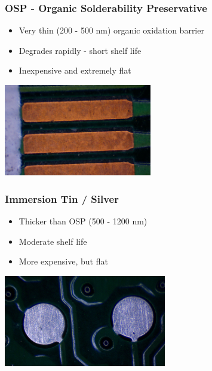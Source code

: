 \documentclass{beamer}
\begin{document}
\begin{frame}
\frametitle{OSP - Organic Solderability Preservative}
\begin{itemize}
\item Very thin (200 - 500 nm) organic oxidation barrier
\item Degrades rapidly - short shelf life
\item Inexpensive and extremely flat
\end{itemize}
\begin{center}
\includegraphics[height=4cm,keepaspectratio]{osp.jpg}
\end{center}
\end{frame}

\begin{frame}
\frametitle{Immersion Tin / Silver}
\begin{itemize}
\item Thicker than OSP (500 - 1200 nm)
\item Moderate shelf life
\item More expensive, but flat
\end{itemize}
\begin{center}
\includegraphics[height=4cm,keepaspectratio]{immersion-silver.jpg}
\end{center}
\end{frame}
\end{document}
